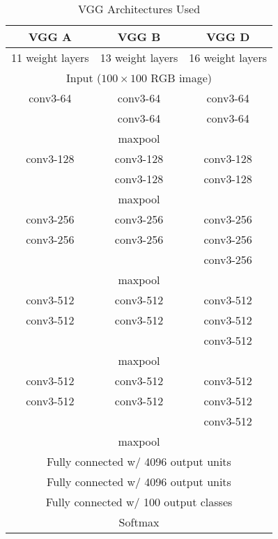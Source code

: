 \documentclass[10pt,twocolumn,letterpaper]{article}
\begin{document}
\begin{table}[th]
  \caption{VGG Architectures Used}
  \label{tab:vgg_archs}
  \centering
  \begin{tabular}{ c | c | c }
    \toprule
    VGG A & VGG B & VGG D \\
    \midrule
    11 weight layers & 13 weight layers & 16 weight layers \\
    \midrule
    \multicolumn{3}{c}{Input ($100 \times 100$ RGB image)} \\
    \midrule
    conv3-64 & conv3-64 & conv3-64 \\
     & conv3-64 & conv3-64 \\
    \midrule
    \multicolumn{3}{c}{maxpool} \\
    \midrule
    conv3-128 & conv3-128 & conv3-128 \\
     & conv3-128 & conv3-128 \\
    \midrule
    \multicolumn{3}{c}{maxpool} \\
    \midrule
    conv3-256 & conv3-256 & conv3-256 \\
    conv3-256 & conv3-256 & conv3-256 \\
     & & conv3-256 \\
    \midrule
    \multicolumn{3}{c}{maxpool} \\
    \midrule
    conv3-512 & conv3-512 & conv3-512 \\
    conv3-512 & conv3-512 & conv3-512 \\
     & & conv3-512 \\
    \midrule
    \multicolumn{3}{c}{maxpool} \\
    \midrule
    conv3-512 & conv3-512 & conv3-512 \\
    conv3-512 & conv3-512 & conv3-512 \\
     & & conv3-512 \\
    \midrule
    \multicolumn{3}{c}{maxpool} \\
    \midrule
    \multicolumn{3}{c}{Fully connected w/ 4096 output units} \\
    \midrule
    \multicolumn{3}{c}{Fully connected w/ 4096 output units} \\ 
    \midrule
    \multicolumn{3}{c}{Fully connected w/ 100 output classes} \\
    \midrule
    \multicolumn{3}{c}{Softmax} \\
    \midrule
    \bottomrule
  \end{tabular}
\end{table}
\end{document}
